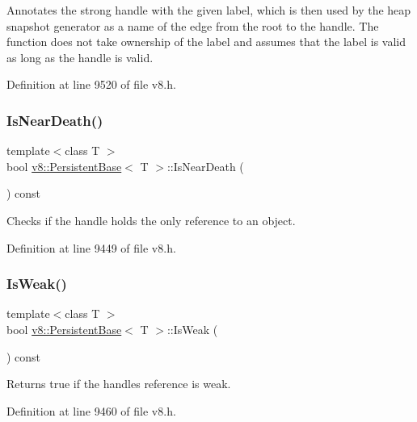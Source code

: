 Annotates the strong handle with the given label, which is then used by the heap snapshot generator as a name of the edge from the root to the handle. The function does not take ownership of the label and assumes that the label is valid as long as the handle is valid. 

Definition at line 9520 of file v8.\+h.

\mbox{\label{classv8_1_1PersistentBase_a6587b66b7d4c0397129c51d0507b4094}} 
\subsubsection{\texorpdfstring{Is\+Near\+Death()}{IsNearDeath()}}
{\footnotesize\ttfamily template$<$class T $>$ \\
bool \mbox{\hyperlink{classv8_1_1PersistentBase}{v8\+::\+Persistent\+Base}}$<$ T $>$\+::Is\+Near\+Death (\begin{DoxyParamCaption}{ }\end{DoxyParamCaption}) const}

Checks if the handle holds the only reference to an object. 

Definition at line 9449 of file v8.\+h.

\mbox{\label{classv8_1_1PersistentBase_a479c7b146da083aa608e133a7dec79f9}} 
\subsubsection{\texorpdfstring{Is\+Weak()}{IsWeak()}}
{\footnotesize\ttfamily template$<$class T $>$ \\
bool \mbox{\hyperlink{classv8_1_1PersistentBase}{v8\+::\+Persistent\+Base}}$<$ T $>$\+::Is\+Weak (\begin{DoxyParamCaption}{ }\end{DoxyParamCaption}) const}

Returns true if the handle\textquotesingle{}s reference is weak. 

Definition at line 9460 of file v8.\+h.

\mbox{\label{classv8_1_1PersistentBase_a7244edd33a45b7d95e566fce85e3f87d}} 
